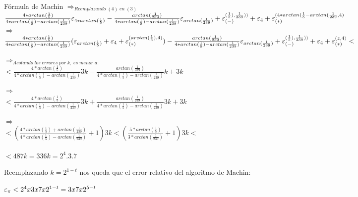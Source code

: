 \begin{section}{Fórmula de Machin}
	$\Rightarrow_{Reemplazando \; (4) \; en \; (3)}$\\
	
	$\frac{4*arctan(\frac{1}{5})}{4*arctan(\frac{1}{5})-arctan(\frac{1}{239})}\varepsilon _{4*arctan(\frac{1}{5})} - \frac{arctan(\frac{1}{239})}{4*arctan(\frac{1}{5})-arctan(\frac{1}{239})}\varepsilon _{arctan(\frac{1}{239})} + \varepsilon _{({-})}^{({\frac{1}{5}),\frac{1}{239})})} + \varepsilon _{4} + \varepsilon _{({*})}^{({4*arctan(\frac{1}{5}-arctan(\frac{1}{239},4})}$\\
	
	$\Rightarrow$\\
	
	$\frac{4*arctan(\frac{1}{5})}{4*arctan(\frac{1}{5})-arctan(\frac{1}{239})}(\varepsilon _{arctan(\frac{1}{5})}+\varepsilon _{4}+\varepsilon _{({*})}^{({arctan(\frac{1}{5}),4})}) - \frac{arctan(\frac{1}{239})}{4*arctan(\frac{1}{5})-arctan(\frac{1}{239})}\varepsilon _{arctan(\frac{1}{239})} + \varepsilon _{({-})}^{({\frac{1}{5}),\frac{1}{239})})} + \varepsilon _{4} + \varepsilon _{({*})}^{({z,4})} < $
	
	$\Rightarrow_{Acotando \; los \; errores \; por \; k, \; es \; menor \; a:}$\\
	
	$< \frac{4*arctan(\frac{1}{5})}{4*arctan(\frac{1}{5})-arctan(\frac{1}{239})}3k - \frac{arctan(\frac{1}{239})}{4*arctan(\frac{1}{5})-arctan(\frac{1}{239})}k+3k $
	
	$\Rightarrow$\\
	
	$< \frac{4*arctan(\frac{1}{5})}{4*arctan(\frac{1}{5})-arctan(\frac{1}{239})}3k + \frac{arctan(\frac{1}{239})}{4*arctan(\frac{1}{5})-arctan(\frac{1}{239})}3k+3k $
	
	$\Rightarrow$\\
	
	$< (\frac{4*arctan(\frac{1}{5})+arctan(\frac{1}{239})}{4*arctan(\frac{1}{5})-arctan(\frac{1}{239})} + 1) 3k <  (\frac{5*arctan(\frac{1}{5})}{3*arctan(\frac{1}{239})} + 1)3k < $\\
	
	\color{red}{DESDE ACA}\\
	
	$< 48 7k = 336k = 2^{4}.3.7$
	
	Reemplazando $k=2^{1-t}$ nos queda que el error relativo del algoritmo de Machin:
	
		$\varepsilon _{\pi} < 2^{4} x 3 x 7 x 2^{1-t} = 3 x 7 x 2^{5-t}$
	
	
\end{section}

